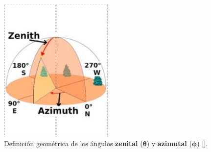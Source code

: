\begin{frame}{}
\begin{columns}
            \begin{column}{0.3\textwidth} %
            \begin{figure}
                    \includegraphics[width=0.5\textwidth]{Figures/angles.png}
                    \caption{\tiny Definición geométrica de los ángulos \textbf{zenital} ($\bm{\theta}$) y \textbf{azimutal} ($\bm{\phi}$) [\cite{asorey2018}].}
            \end{figure}
            \end{column}
        \end{columns}
    \end{frame}

        
